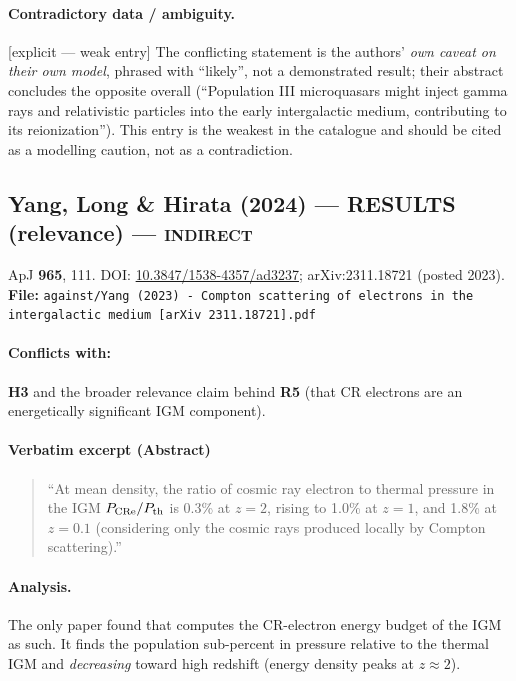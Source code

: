 \documentclass[11pt,a4paper]{article}
\newcommand{\RES}{\textcolor{red!60!black}{\textbf{RESULTS}}}
\newcommand{\flag}[1]{\textcolor{orange!75!black}{\textsf{\small [#1]}}}
\begin{document}
\paragraph{Contradictory data / ambiguity.} \flag{explicit --- weak entry}
The conflicting statement is the authors' \emph{own caveat on their own model},
phrased with ``likely'', not a demonstrated result; their abstract concludes the
opposite overall (``Population III microquasars might inject gamma rays and
relativistic particles into the early intergalactic medium, contributing to its
reionization''). This entry is the weakest in the catalogue and should be cited
as a modelling caution, not as a contradiction.

\subsection{Yang, Long \& Hirata (2024) --- \RES{} (relevance) --- \textsc{indirect}}
\noindent ApJ \textbf{965}, 111. DOI:
\href{https://doi.org/10.3847/1538-4357/ad3237}{10.3847/1538-4357/ad3237};
arXiv:2311.18721 (posted 2023).\\
\textbf{File:} \texttt{against/Yang (2023) - Compton scattering of electrons in the intergalactic medium [arXiv 2311.18721].pdf}

\paragraph{Conflicts with:} \textbf{H3} and the broader relevance claim behind
\textbf{R5} (that CR electrons are an energetically significant IGM component).

\paragraph{Verbatim excerpt (Abstract)}
\begin{quote}\small
``At mean density, the ratio of cosmic ray electron to thermal pressure in the
IGM $P_{\rm CRe}/P_{\rm th}$ is 0.3\% at $z=2$, rising to 1.0\% at $z=1$, and
1.8\% at $z=0.1$ (considering only the cosmic rays produced locally by Compton
scattering).''
\end{quote}

\paragraph{Analysis.}
The only paper found that computes the CR-electron energy budget of the IGM as
such. It finds the population sub-percent in pressure relative to the thermal
IGM and \emph{decreasing} toward high redshift (energy density peaks at
$z\approx2$).
\end{document}
